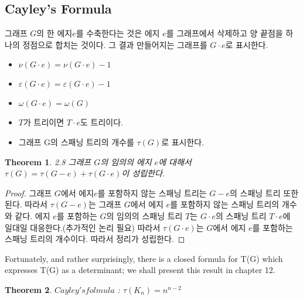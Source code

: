 \documentclass{oblivoir}
\newtheorem{theorem}{Theorem}[section]
\begin{document}
\subsection{Cayley's Formula}
\begin{dfn}[contract]
    그래프 $G$의 한 에지$e$를 수축한다는 것은 에지 $e$를 그래프에서 삭제하고 양 끝점을 하나의 정점으로 합치는 것이다. 그 결과 만들어지는 그래프를 $G \cdot e$로 표시한다.
    \begin{itemize}
        \item $\nu(G \cdot e) = \nu(G \cdot e) - 1$
        \item $\varepsilon(G \cdot e) = \varepsilon(G \cdot e)-1$
        \item $\omega(G \cdot e) = \omega(G)$
        \item  $T$가 트리이면 $T \cdot e$도 트리이다.
        \item 그래프 G의 스패닝 트리의 개수를 $\tau(G)$로 표시한다.
    \end{itemize}
\end{dfn}

\begin{theorem}
    2.8 그래프 $G$의 임의의 에지 $e$에 대해서 $\tau(G) =\tau(G-e) + \tau(G \cdot e)$이 성립한다.
\end{theorem}

\begin{proof}
    그래프 $G$에서 에지$e$를 포함하지 않는 스패닝 트리는 $G-e$의 스패닝 트리 또한 된다.
    따라서 $\tau(G-e)$는 그래프 $G$에서 에지 $e$를 포함하지 않는 스패닝 트리의 개수와 같다.
    에지 $e$를 포함하는 $G$의 임의의 스패닝 트리 $T$는 $G \cdot e$의 스패닝 트리 $T \cdot e$에 일대일 대응한다.(추가적인 논리 필요) 따라서 $\tau(G \cdot e)$는 $G$에서 에지 $e$를 포함하는 스패닝 트리의 개수이다. 따라서 정리가 성립한다.
\end{proof}


Fortunately, and rather surprisingly, there is a closed formula for T(G) which expresses T(G) as a determinant; 
we shall present this result in chapter 12.


\begin{theorem}
    $Cayley's folmula$ : $\tau(K_n)= n^{n-2}$
\end{theorem}
\end{document}
